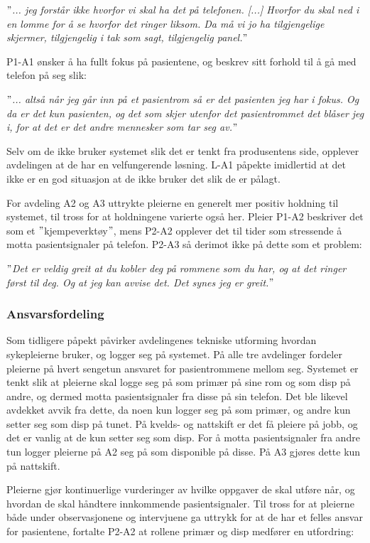 \noindent
\textit{$"$... jeg forstår ikke hvorfor vi skal ha det på telefonen. [...] Hvorfor du skal ned i en lomme for å se hvorfor det ringer liksom. Da må vi jo ha tilgjengelige skjermer, tilgjengelig i tak som sagt, tilgjengelig panel.$"$}

\noindent
P1-A1 ønsker å ha fullt fokus på pasientene, og beskrev sitt forhold til å gå med telefon på seg slik:

\noindent
\textit{$"$... altså når jeg går inn på et pasientrom så er det pasienten jeg har i fokus. Og da er det kun pasienten, og det som skjer utenfor det pasientrommet det blåser jeg i, for at det er det andre mennesker som tar seg av.$"$}

\noindent
Selv om de ikke bruker systemet slik det er tenkt fra produsentens side, opplever avdelingen at de har en velfungerende løsning. L-A1 påpekte imidlertid at det ikke er en god situasjon at de ikke bruker det slik de er pålagt.

\noindent
For avdeling A2 og A3 uttrykte pleierne en generelt mer positiv holdning til systemet, til tross for at holdningene varierte også her. Pleier P1-A2 beskriver det som et $"$kjempeverktøy$"$, mens P2-A2 opplever det til tider som stressende å motta pasientsignaler på telefon. P2-A3 så derimot ikke på dette som et problem: 

\noindent
\textit{$"$Det er veldig greit at du kobler deg på rommene som du har, og at det ringer først til deg. Og at jeg kan avvise det. Det synes jeg er greit.$"$}

\subsubsection{Ansvarsfordeling}
Som tidligere påpekt påvirker avdelingenes tekniske utforming hvordan sykepleierne bruker, og logger seg på systemet. På alle tre avdelinger fordeler pleierne på hvert sengetun ansvaret for pasientrommene mellom seg. Systemet er tenkt slik at pleierne skal logge seg på som primær på sine rom og som disp på andre, og dermed motta pasientsignaler fra disse på sin telefon. Det ble likevel avdekket avvik fra dette, da noen kun logger seg på som primær, og andre kun setter seg som disp på tunet. På kvelds- og nattskift er det få pleiere på jobb, og det er vanlig at de kun setter seg som disp. For å motta pasientsignaler fra andre tun logger pleierne på A2 seg på som disponible på disse. På A3 gjøres dette kun på nattskift. 

\noindent
Pleierne gjør kontinuerlige vurderinger av hvilke oppgaver de skal utføre når, og hvordan de skal håndtere innkommende pasientsignaler. Til tross for at pleierne både under observasjonene og intervjuene ga uttrykk for at de har et felles ansvar for pasientene, fortalte P2-A2 at rollene primær og disp medfører en utfordring:


